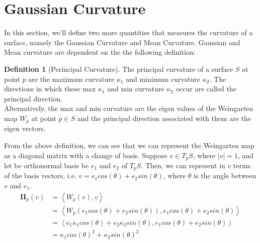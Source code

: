 \documentclass{article}
\theoremstyle{plain}
\theoremstyle{definition}
\newtheorem{definition}{Definition}
\theoremstyle{remark}
\begin{document}

\section{Gaussian Curvature}
In this section, we'll define two more quantities that measures the curvature of a surface, namely the Gaussian Curvature and Mean Curvature. Gaussian and Mean curvature are dependent on the the following definition:

\begin{definition}[Perincipal Curvature]
    The principal curvature of a surface \( S\) at point \(p\) are the maximum curvature \(\kappa_1\) and minimum curvature \( \kappa_2 \). The directions in which these max \(\kappa_1\) and min curvature \(\kappa_2\) occur are called the principal direction. \\
    Alternatively, the max and min curvature are the eigen values of the Weingarten map \( W_p\) at point \(p \in S\) and the principal direction associated with them are the eigen vectors.
\end{definition}

From the above definition, we can see that we can represent the Weingarten map as a diagonal matrix with a change of basis. Suppose \(v \in T_pS\), where \(|v| = 1\), and let be orthonormal basis be  \( e_1 \) and \( e_2 \) of \( T_pS\). Then, we can represent in \(v\) terms of the basis vectors, i.e. \( v = e_1 cos(\theta) + e_2 sin(\theta)\), where \( \theta \) is the angle between \( v\) and \( e_1\).
\begin{align*}
    \mathbf{II}_p(v) & = \left\langle W_p(v), v\right\rangle                                                                              \\
                     & = \left\langle W_p(e_1 cos(\theta) + e_2 sin(\theta)), e_1 cos(\theta) + e_2 sin(\theta) \right\rangle             \\
                     & = \left\langle e_1 \kappa_1 cos(\theta) + e_2 \kappa_2 sin(\theta), e_1 cos(\theta) + e_2 sin(\theta)\right\rangle \\
                     & = \kappa_1 cos(\theta)^2 + \kappa_2 sin(\theta)^2
\end{align*}
\end{document}
